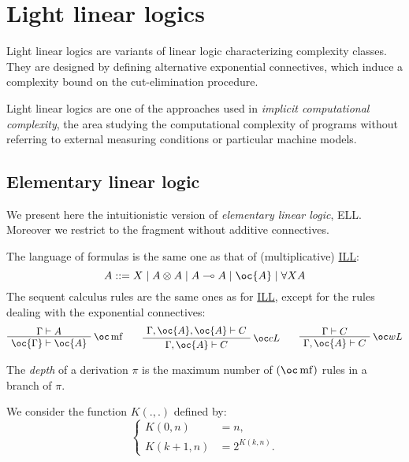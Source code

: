 \chapter{Light linear logics}\label{light-linear-logics}

Light linear logics are variants of linear logic characterizing
complexity classes. They are designed by defining alternative
exponential connectives, which induce a complexity bound on the
cut-elimination procedure.

Light linear logics are one of the approaches used in \emph{implicit
computational complexity}, the area studying the computational
complexity of programs without referring to external measuring
conditions or particular machine models.

\section{Elementary linear logic}\label{elementary-linear-logic}

We present here the intuitionistic version of \emph{elementary linear
logic}, ELL. Moreover we restrict to the fragment without additive
connectives.

The language of formulas is the same one as that of (multiplicative)
\hyperref[intuitionistic-linear-logic]{ILL}:
\begin{equation*}
A ::= X \mid A\tens A \mid A\limp A  \mid \oc{A} \mid \forall X A
\end{equation*}
The sequent calculus rules are the same ones as for
\hyperref[intuitionistic-linear-logic]{ILL}, except for the rules dealing
with the exponential connectives:
\begin{equation*}
\AxRule{\Gamma\vdash A}
\LabelRule{\oc\rulename{mf} }
\UnaRule{\oc{\Gamma}\vdash\oc{A}}
\DisplayProof
\qquad
\AxRule{\Gamma,\oc{A},\oc{A}\vdash C}
\LabelRule{\oc c L}
\UnaRule{\Gamma,\oc{A}\vdash C}
\DisplayProof
\qquad
\AxRule{\Gamma\vdash C}
\LabelRule{\oc w L}
\UnaRule{\Gamma,\oc{A}\vdash C}
\DisplayProof
\end{equation*}

The \emph{depth} of a derivation \(\pi\) is the maximum number of
\((\oc\rulename{mf})\) rules in a branch of \(\pi\).

We consider the function \(K(.,.)\) defined by:
\begin{equation*}
\begin{cases}
K(0,n) &=n,\\
K(k+1,n) &=2^{K(k,n)}.
\end{cases}
\end{equation*}

